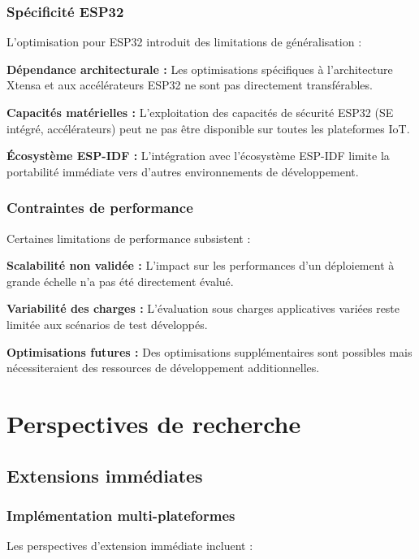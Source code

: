 \subsubsection{Spécificité ESP32}

L'optimisation pour ESP32 introduit des limitations de généralisation :

\textbf{Dépendance architecturale :} Les optimisations spécifiques à l'architecture Xtensa et aux accélérateurs ESP32 ne sont pas directement transférables.

\textbf{Capacités matérielles :} L'exploitation des capacités de sécurité ESP32 (SE intégré, accélérateurs) peut ne pas être disponible sur toutes les plateformes IoT.

\textbf{Écosystème ESP-IDF :} L'intégration avec l'écosystème ESP-IDF limite la portabilité immédiate vers d'autres environnements de développement.

\subsubsection{Contraintes de performance}

Certaines limitations de performance subsistent :

\textbf{Scalabilité non validée :} L'impact sur les performances d'un déploiement à grande échelle n'a pas été directement évalué.

\textbf{Variabilité des charges :} L'évaluation sous charges applicatives variées reste limitée aux scénarios de test développés.

\textbf{Optimisations futures :} Des optimisations supplémentaires sont possibles mais nécessiteraient des ressources de développement additionnelles.

\section{Perspectives de recherche}

\subsection{Extensions immédiates}

\subsubsection{Implémentation multi-plateformes}

Les perspectives d'extension immédiate incluent :

